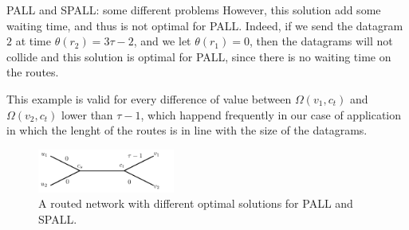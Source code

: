 \documentclass[10pt]{article}
\newcommand\pall{\textsc{PALL}\xspace}
\newcommand\spall{\textsc{SPALL}\xspace}
\begin{document}
\begin{subsection}{\pall and \spall: some different problems}
However, this solution add some waiting time, and thus is not optimal for \pall. Indeed, if we send the datagram $2$ at time  $\theta (r_2) = 3\tau-2 $, and we let $\theta(r_1) = 0$, then the datagrams will not collide and this solution is optimal for \pall, since there is no waiting time on the routes.

This example is valid for every difference of value between $\Omega(v_1,c_t)$ and $\Omega(v_2,c_t)$ lower than $\tau -1$, which happend frequently in our case of application in which the lenght of the routes is in line with the size of the datagrams.

  \begin{figure}
  \begin{center}
 \includegraphics[width=0.4\textwidth]{examplestar}
\caption{A routed network with different optimal solutions for PALL and SPALL.}\label{fig:pallpallexample}
\end{center}
\end{figure}
  
    \end{subsection}
    
\end{document}
